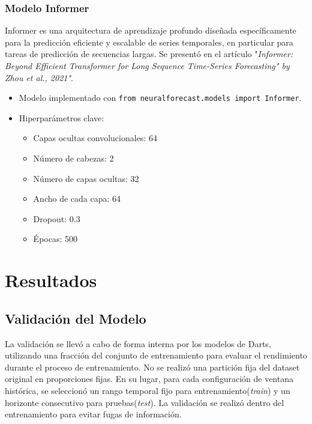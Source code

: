 \documentclass[12pt]{article}
\begin{document}
\subsubsection{Modelo Informer}

Informer es una arquitectura de aprendizaje profundo diseñada específicamente para  la predicción eficiente y escalable de series temporales, en particular para tareas de predicción de secuencias largas. Se presentó en el artículo "\textit{Informer: Beyond Efficient Transformer for Long Sequence Time-Series Forecasting" by Zhou et al., 2021"}.


\begin{itemize}
\item Modelo implementado con \texttt{from neuralforecast.models import Informer}.
\item Hiperparámetros clave:
\begin{itemize}
\item Capas ocultas convolucionales: 64
\item Número de cabezas: 2
\item Número de capas ocultas: 32
\item Ancho de cada capa: 64
\item Dropout: 0.3
\item Épocas: 500
\end{itemize}
\end{itemize}


\newpage
\section{Resultados}
\label{sec:resultados}

\subsection{Validación del Modelo}
La validación se llevó a cabo de forma interna por los modelos de Darts, utilizando una fracción del conjunto de entrenamiento para evaluar el rendimiento durante el proceso de entrenamiento. No se realizó una partición fija del dataset original en proporciones fijas. En su lugar,  para cada configuración de ventana histórica, se seleccionó un rango temporal fijo para entrenamiento(\textit{train}) y un horizonte consecutivo para pruebas(\textit{test}). La validación se realizó dentro del entrenamiento para evitar fugas de información.
\end{document}
